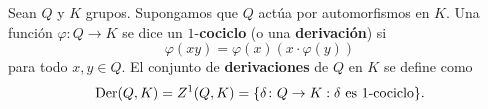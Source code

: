 %
%
%
%
%	
%	
%


\begin{definition}
	Sean $Q$ y $K$ grupos. Supongamos que $Q$ actúa por automorfismos en $K$.
	Una función $\varphi\colon Q\to K$ se dice un  $1$-\textbf{cociclo} (o una
	\textbf{derivación}) si 
	\[
		\varphi(xy)=\varphi(x)(x\cdot\varphi(y))
	\]
	para todo $x,y\in Q$.  El conjunto de \textbf{derivaciones} de $Q$ en $K$
	se define como
	\[
	\operatorname{Der}(Q,K)=Z^1(Q,K)=\{\delta\colon Q\to K:\text{$\delta$ es $1$-cociclo}\}.
	\]
\end{definition}

